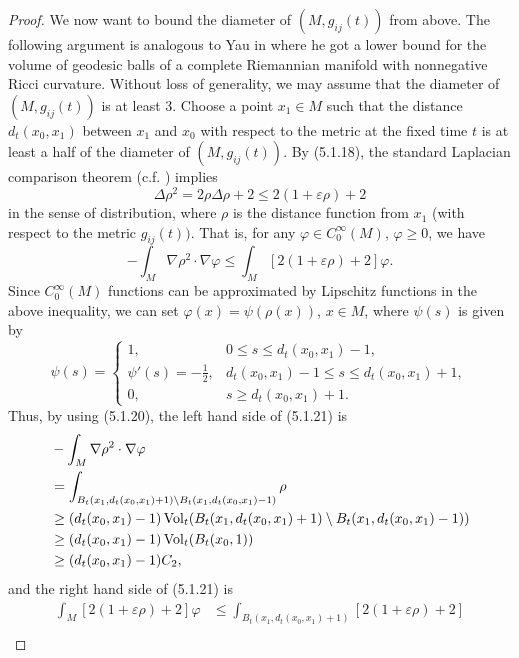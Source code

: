 \begin{proof}
We now want to bound the diameter of $(M,g_{ij}(t))$ from above.
The following argument is analogous to Yau in \cite{Y76} where he
got a lower bound for the volume of geodesic balls of a complete
Riemannian manifold with nonnegative Ricci curvature. Without loss
of generality, we may assume that the diameter of $(M,g_{ij}(t))$
is at least 3. Choose a point $x_1\in M$ such that the distance
$d_t(x_0,x_1)$ between $x_1$ and $x_0$ with respect to the metric
at the fixed time $t$ is at least a half of the diameter of
$(M,g_{ij}(t))$. By (5.1.18), the standard Laplacian comparison
theorem (c.f. \cite{ScY}) implies
$$
\Delta \rho^2=2\rho\Delta\rho+2\leq2(1+\varepsilon\rho)+2
$$
in the sense of distribution, where $\rho$ is the distance
function from $x_1$ (with respect to the metric $g_{ij}(t))$. That
is, for any $\varphi\in C_0^\infty(M)$, $\varphi\geq0$, we have
\begin{equation} -\int_M\nabla\rho^2\cdot\nabla\varphi
\leq\int_M[2(1+\varepsilon\rho)+2]\varphi. %
\end{equation} Since $C_0^\infty(M)$ functions can be approximated by
Lipschitz functions in the above inequality, we can set
$\varphi(x)=\psi(\rho(x))$, $x\in M$, where $\psi(s)$ is given by
$$
\psi(s)=\begin{cases}
1,& 0\leq s\leq d_t(x_0,x_1)-1,\\
\psi'(s)=-\frac{1}{2},& d_t(x_0,x_1)-1\leq s\leq
d_t(x_0,x_1)+1,\\
0,& s\geq d_t(x_0,x_1)+1.
\end{cases}
$$
Thus, by using (5.1.20), the left hand side of (5.1.21) is
\begin{displaymath}
\begin{split}
&-\int_M\nabla\rho^2\cdot\nabla\varphi \\
&  =\int_{B_t(x_1,d_t(x_0,x_1)+1)
\setminus B_t(x_1,d_t(x_0,x_1)-1)}\rho\\
&  \geq(d_t(x_0,x_1)-1)\operatorname{Vol}_t(B_t(x_1,d_t(x_0,x_1)+1)
\setminus B_t(x_1,d_t(x_0,x_1)-1))\\
&  \geq(d_t(x_0,x_1)-1)\operatorname{Vol}_t(B_t(x_0,1))\\
&  \geq(d_t(x_0,x_1)-1)C_2,
\end{split}
\end{displaymath}
 and the right hand side of (5.1.21) is
\begin{displaymath}
\begin{split}
\int_M[2(1+\varepsilon\rho)+2]\varphi
&  \leq\int_{B_t(x_1,d_t(x_0,x_1)+1)}[2(1+\varepsilon\rho)+2]\\

\end{split}
\end{displaymath}
\end{proof}
